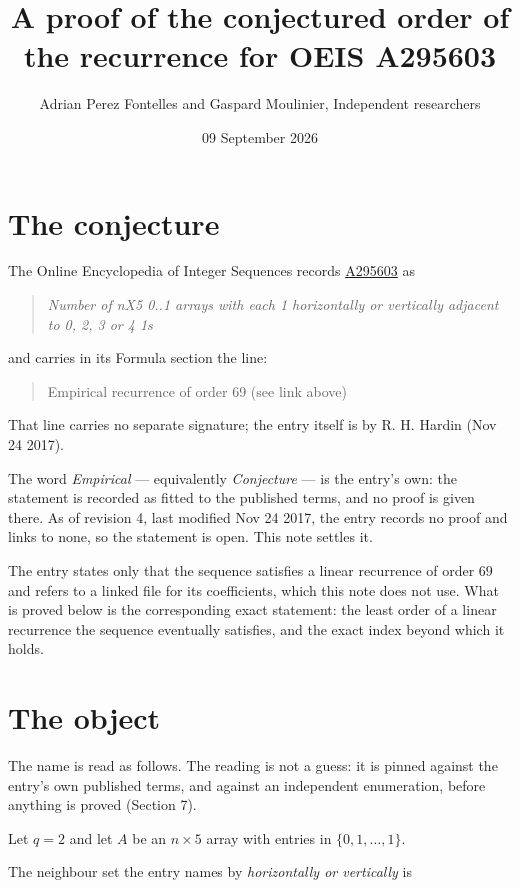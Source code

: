 \documentclass[11pt]{article}
\title{A proof of the conjectured order of the recurrence for OEIS A295603}
\author{Adrian Perez Fontelles and Gaspard Moulinier, Independent researchers}
\date{09 September 2026}
\theoremstyle{definition}
\begin{document}
\maketitle
\section{The conjecture}

The Online Encyclopedia of Integer Sequences records \href{https://oeis.org/A295603}{A295603} as

\begin{quote}\itshape Number of nX5 0..1 arrays with each 1 horizontally or vertically adjacent to 0, 2, 3 or 4 1s\end{quote}

and carries in its Formula section the line:

\begin{quote}\ttfamily Empirical recurrence of order 69 (see link above)\end{quote}

That line carries no separate signature; the entry itself is by R. H. Hardin (Nov 24 2017).

The word {\itshape Empirical} --- equivalently {\itshape Conjecture} --- is the entry's own: the statement is recorded as fitted to the published terms, and no proof is given there. As of revision 4, last modified Nov 24 2017, the entry records no proof and links to none, so the statement is open. This note settles it.

The entry states only that the sequence satisfies a linear recurrence of order $69$ and refers to a linked file for its coefficients, which this note does not use. What is proved below is the corresponding exact statement: the least order of a linear recurrence the sequence eventually satisfies, and the exact index beyond which it holds.

\section{The object}

The name is read as follows. The reading is not a guess: it is pinned against the entry's own published terms, and against an independent enumeration, before anything is proved (Section 7).

Let $q = 2$ and let $A$ be an $n \times 5$ array with entries in $\{0,1,\dots,1\}$.

The neighbour set the entry names by {\itshape horizontally or vertically} is
\end{document}
